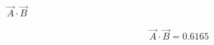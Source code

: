 $\overrightarrow{A} \cdot \overrightarrow{B}$

\begin{solution}
\begin{align*}
    \overrightarrow{A} \cdot \overrightarrow{B} = 0.6165
\end{align*}
\end{solution}